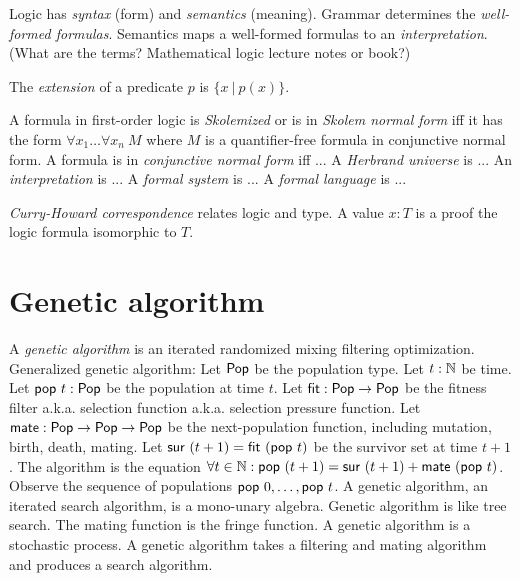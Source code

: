 Logic has \emph{syntax} (form) and \emph{semantics} (meaning).
Grammar determines the \emph{well-formed formulas}.
Semantics maps a well-formed formulas to an \emph{interpretation}.
(What are the terms? Mathematical logic lecture notes or book?)

%
The \emph{extension} of a predicate \(p\) is \(\{x~|~p(x)\}\).

%
%
%
%
A formula in first-order logic is \emph{Skolemized} or is in \emph{Skolem normal form}
iff it has the form \(\forall x_1 \ldots \forall x_n ~ M\)
where \(M\) is a quantifier-free formula in conjunctive normal form.
A formula is in \emph{conjunctive normal form} iff ...
%
A \emph{Herbrand universe} is ...
%
An \emph{interpretation} is ...
A \emph{formal system} is ...
A \emph{formal language} is ...

%
\emph{Curry-Howard correspondence} relates logic and type.
A value \(x : T\) is a proof the logic formula isomorphic to \(T\).

\section{Genetic algorithm}

\newcommand\fit{\fun{fit}}
\newcommand\mate{\fun{mate}}
\newcommand\pop{\fun{pop}}
\newcommand\sur{\fun{sur}}
\newcommand\Pop{\fun{Pop}}

A \emph{genetic algorithm} is an iterated randomized mixing filtering optimization.
Generalized genetic algorithm:
Let \(\Pop\) be the population type.
Let \(t : \mathbb{N}\) be time.
Let \(\pop~t : \Pop\) be the population at time \(t\).
Let \(\fit : \Pop \to \Pop\) be the fitness filter a.k.a. selection function a.k.a. selection pressure function.
Let \(\mate : \Pop \to \Pop \to \Pop\) be the next-population function,
including mutation, birth, death, mating.
Let \(\sur~(t+1) = \fit~(\pop~t)\) be the survivor set at time \(t+1\).
The algorithm is the equation \(\forall t \in \Nat : \pop~(t+1) = \sur~(t+1) + \mate~(\pop~t)\).
Observe the sequence of populations \(\pop~0, \ldots, \pop~t\).
A genetic algorithm, an iterated search algorithm, is a mono-unary algebra.
Genetic algorithm is like tree search.
The mating function is the fringe function.
A genetic algorithm is a stochastic process.
A genetic algorithm takes a filtering and mating algorithm and produces a search algorithm.

